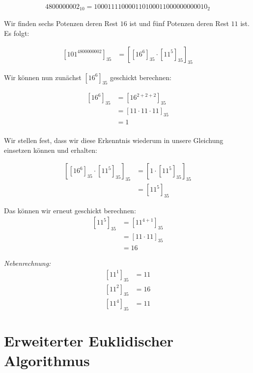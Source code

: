 \documentclass{../crypto}
\begin{document}
\begin{align*}4800000002_{10} = 1 00 01 11 10 00 01 10 10 00 11 00 00 00 00 00 10_2\end{align*}

Wir finden sechs Potenzen deren Rest $16$ ist und fünf Potenzen deren Rest $11$ 
ist. Es folgt:

\begin{align*}
  \left[101^{4800000002}\right]_{35} &= \left[ \left[16^6\right]_{35} 
                                         \cdot \left[11^5\right]_{35}
                                        \right]_{35}
\end{align*}

Wir können nun zunächst $\left[16^6\right]_{35}$ geschickt berechnen:

\begin{align*}
  \left[16^6\right]_{35} &= \left[16^{2+2+2}\right]_{35} \\
                         &= \left[11 \cdot 11 \cdot 11\right]_{35} \\
                         &= 1 \\
\end{align*}

Wir stellen fest, dass wir diese Erkenntnis wiederum in unsere Gleichung 
einsetzen können und erhalten:

\begin{align*}
  \left[ \left[16^6\right]_{35} \cdot \left[11^5\right]_{35} \right]_{35} 
                    &= \left[1 \cdot \left[11^5\right]_{35} \right]_{35} \\
                    &= \left[11^5\right]_{35}
\end{align*}

Das können wir erneut geschickt berechnen:
\begin{align*}
  \left[11^{5}\right]_{35} &= \left[11^{4+1}\right]_{35} \\
                           &= \left[11 \cdot 11\right]_{35} \\
                           &= 16
\end{align*}
  
\emph{Nebenrechnung:}
\begin{align*}
  \left[11^{1}\right]_{35} &= 11 \\
  \left[11^{2}\right]_{35} &= 16 \\
  \left[11^{4}\right]_{35} &= 11
\end{align*}


\section{Erweiterter Euklidischer Algorithmus}
\end{document}
